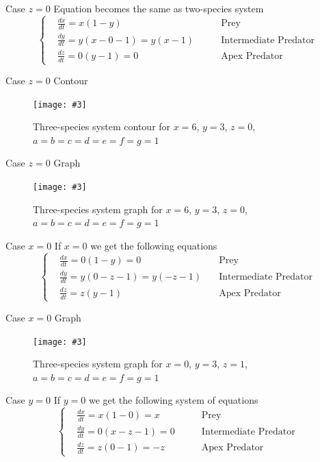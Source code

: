 \documentclass[hyperref={colorlinks,allcolors=black}]{beamer}
\newcommand{\makefig}[4]{
\begin{figure}[#1]
    \captionsetup{justification=centering}
    \texttt{[image: \#3]}
    \caption{#4}
    \label{fig:#3}
\end{figure}
}
\begin{document}
\begin{frame}{Case $z=0$}
Equation becomes the same as two-species system
\begin{equation}\nonumber
    \left\{\begin{aligned}
        &\frac{dx}{dt} = x(1 - y)              &\text{Prey}\\
        &\frac{dy}{dt} = y(x - 0 - 1) = y(x-1) 
            \qquad &\text{Intermediate Predator}\\
        &\frac{dz}{dt} = 0(y - 1) = 0             &\text{Apex Predator}
    \end{aligned}\right.
\end{equation}
\end{frame}

\begin{frame}{Case $z=0$ Contour}
\makefig{h}{0.7\textwidth}{3s_z_zero_contour}{Three-species system contour for $x=6$, $y=3$, $z=0$, $a=b=c=d=e=f=g=1$}
\end{frame}

\begin{frame}{Case $z=0$ Graph}
\makefig{h}{0.8\textwidth}{3s_z_zero_graph}{Three-species system graph for $x=6$, $y=3$, $z=0$, $a=b=c=d=e=f=g=1$}
\end{frame}

\begin{frame}{Case $x=0$}
If $x=0$ we get the following equations
\begin{equation}\nonumber
    \left\{\begin{aligned}
        &\frac{dx}{dt} = 0(1 - y) = 0              &\text{Prey}\\
        &\frac{dy}{dt} = y(0 - z - 1)=y(-z-1) 
            \quad &\text{Intermediate Predator}\\
        &\frac{dz}{dt} = z(y - 1)             &\text{Apex Predator}
    \end{aligned}\right.
\end{equation}
\end{frame}

\begin{frame}{Case $x=0$ Graph}
\makefig{h}{0.9\textwidth}{3s_x_zero_graph}{Three-species system graph for $x=0$, $y=3$, $z=1$, $a=b=c=d=e=f=g=1$}
\end{frame}

\begin{frame}{Case $y=0$}
If $y=0$ we get the following system of equations
\begin{equation}\nonumber
    \left\{\begin{aligned}
        &\frac{dx}{dt} = x(1 - 0) = x              &\text{Prey}\\
        &\frac{dy}{dt} = 0(x - z - 1)=0 \qquad &\text{Intermediate Predator}\\
        &\frac{dz}{dt} = z(0 - 1) = -z             &\text{Apex Predator}
    \end{aligned}\right.
\end{equation}
\end{frame}
\end{document}
